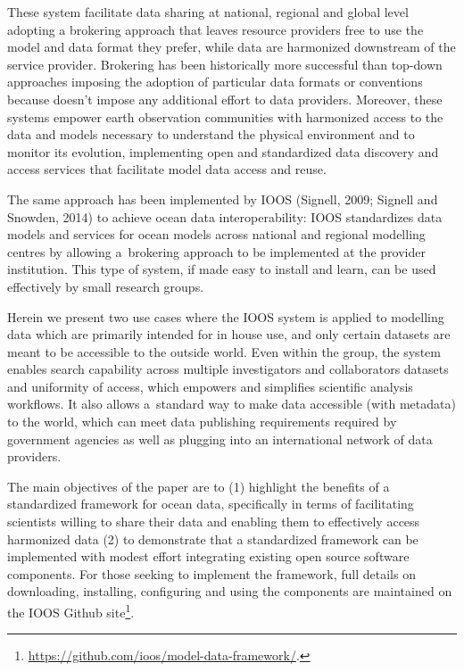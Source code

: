 \documentclass[osd, online, hvmath]{copernicus}
\begin{document}
These system facilitate data sharing at national, regional and global level adopting a brokering approach that leaves resource providers free to use the model and data format they prefer, while data are harmonized downstream of the service provider. Brokering has been historically more successful than top-down
approaches imposing the adoption of particular data formats or 
conventions because doesn't impose any additional effort to data providers.  
Moreover, these systems empower earth observation communities with harmonized access to the data and models necessary to understand the physical environment and to monitor its evolution, implementing open and standardized data discovery and access services that facilitate model data access and reuse. 

The same approach has been implemented  by IOOS (Signell, 2009; Signell and Snowden, 2014) to achieve ocean data interoperability: IOOS standardizes data models and services for ocean models across national and regional modelling centres by allowing a~brokering approach to be implemented at the provider institution. This type of
system, if made easy to install and learn, can be used effectively by
small research groups.

Herein we present two use cases where the IOOS system is applied to
modelling data which are primarily intended for in house use, and only
certain datasets are meant to be accessible to the outside world. Even
within the group, the system enables search capability across multiple
investigators and collaborators datasets and uniformity of access,
which empowers and simplifies scientific analysis workflows. It also
allows   a~standard way to make data accessible (with metadata) to
the world, which can meet data publishing requirements required by
government agencies as well as plugging into an international network
of data providers.


The main objectives of the paper are  to (1) highlight the benefits of
a standardized framework for ocean data, specifically in terms of
facilitating scientists willing to share their data and  enabling them to
effectively access  harmonized data (2) to demonstrate that a standardized
framework can be implemented with modest effort integrating  existing open
source software components.  For those seeking to implement the framework, full details on downloading, installing, configuring and using the components are maintained on the IOOS Github site\footnote{\url{https://github.com/ioos/model-data-framework/}.}.
\end{document}
